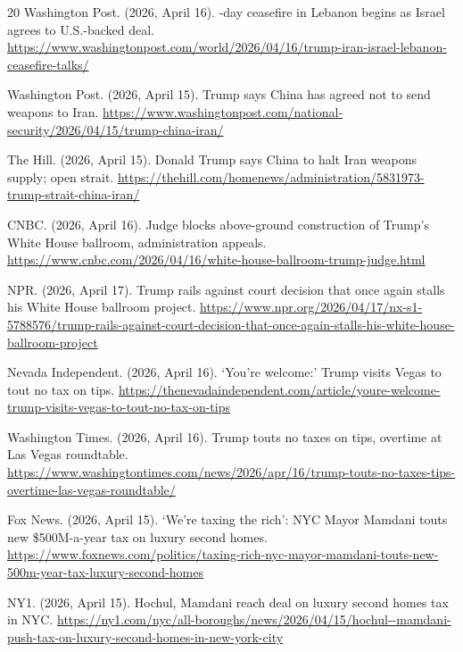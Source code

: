 \documentclass[11pt,a4paper]{article}
\begin{document}
\begin{thebibliography}{20}
Washington Post. (2026, April 16).
-day ceasefire in Lebanon begins as Israel agrees to U.S.-backed deal.
\newblock \url{https://www.washingtonpost.com/world/2026/04/16/trump-iran-israel-lebanon-ceasefire-talks/}

Washington Post. (2026, April 15).
\newblock Trump says China has agreed not to send weapons to Iran.
\newblock \url{https://www.washingtonpost.com/national-security/2026/04/15/trump-china-iran/}

The Hill. (2026, April 15).
\newblock Donald Trump says China to halt Iran weapons supply; open strait.
\newblock \url{https://thehill.com/homenews/administration/5831973-trump-strait-china-iran/}

CNBC. (2026, April 16).
\newblock Judge blocks above-ground construction of Trump's White House ballroom, administration appeals.
\newblock \url{https://www.cnbc.com/2026/04/16/white-house-ballroom-trump-judge.html}

NPR. (2026, April 17).
\newblock Trump rails against court decision that once again stalls his White House ballroom project.
\newblock \url{https://www.npr.org/2026/04/17/nx-s1-5788576/trump-rails-against-court-decision-that-once-again-stalls-his-white-house-ballroom-project}

Nevada Independent. (2026, April 16).
\newblock `You're welcome:' Trump visits Vegas to tout no tax on tips.
\newblock \url{https://thenevadaindependent.com/article/youre-welcome-trump-visits-vegas-to-tout-no-tax-on-tips}

Washington Times. (2026, April 16).
\newblock Trump touts no taxes on tips, overtime at Las Vegas roundtable.
\newblock \url{https://www.washingtontimes.com/news/2026/apr/16/trump-touts-no-taxes-tips-overtime-las-vegas-roundtable/}

Fox News. (2026, April 15).
\newblock `We're taxing the rich': NYC Mayor Mamdani touts new \$500M-a-year tax on luxury second homes.
\newblock \url{https://www.foxnews.com/politics/taxing-rich-nyc-mayor-mamdani-touts-new-500m-year-tax-luxury-second-homes}

NY1. (2026, April 15).
\newblock Hochul, Mamdani reach deal on luxury second homes tax in NYC.
\newblock \url{https://ny1.com/nyc/all-boroughs/news/2026/04/15/hochul--mamdani-push-tax-on-luxury-second-homes-in-new-york-city}

\end{thebibliography}
\end{document}
